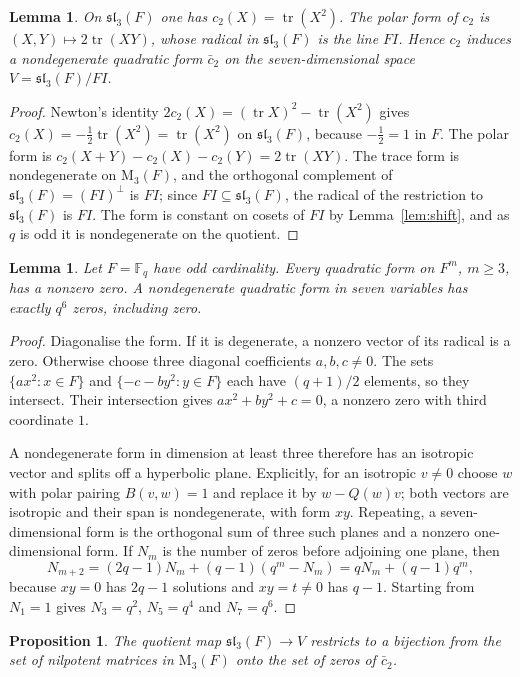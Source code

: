 \documentclass[screen]{aomart}
\newtheorem{proposition}[theorem]{Proposition}
\newtheorem{lemma}[theorem]{Lemma}
\theoremstyle{definition}
\theoremstyle{remark}
\numberwithin{equation}{section}
\newcommand{\F}{\mathbb{F}}
\newcommand{\M}{\mathrm{M}}
\newcommand{\sll}{\mathfrak{sl}}
\newcommand{\tr}{\operatorname{tr}}
\begin{document}
\begin{lemma}\label{lem:quadric}
On $\sll_3(F)$ one has $c_2(X)=\tr(X^2)$. The polar form of $c_2$ is $(X,Y)\mapsto 2\tr(XY)$, whose radical in $\sll_3(F)$ is the line $FI$. Hence $c_2$ induces a nondegenerate quadratic form $\bar c_2$ on the seven-dimensional space $V=\sll_3(F)/FI$.
\end{lemma}

\begin{proof}
Newton's identity $2c_2(X)=(\tr X)^2-\tr(X^2)$ gives $c_2(X)=-\tfrac12\tr(X^2)=\tr(X^2)$ on $\sll_3(F)$, because $-\tfrac12=1$ in $F$. The polar form is $c_2(X+Y)-c_2(X)-c_2(Y)=2\tr(XY)$. The trace form is nondegenerate on $\M_3(F)$, and the orthogonal complement of $\sll_3(F)=(FI)^\perp$ is $FI$; since $FI\subseteq\sll_3(F)$, the radical of the restriction to $\sll_3(F)$ is $FI$. The form is constant on cosets of $FI$ by Lemma~\ref{lem:shift}, and as $q$ is odd it is nondegenerate on the quotient.
\end{proof}

\begin{lemma}\label{lem:finitequadric}
Let $F=\F_q$ have odd cardinality. Every quadratic form on $F^m$, $m\ge3$, has a nonzero zero. A nondegenerate quadratic form in seven variables has exactly $q^6$ zeros, including zero.
\end{lemma}
\begin{proof}
Diagonalise the form. If it is degenerate, a nonzero vector of its radical is a zero. Otherwise choose three diagonal coefficients $a,b,c\ne0$. The sets $\{ax^2:x\in F\}$ and $\{-c-by^2:y\in F\}$ each have $(q+1)/2$ elements, so they intersect. Their intersection gives $ax^2+by^2+c=0$, a nonzero zero with third coordinate $1$.

A nondegenerate form in dimension at least three therefore has an isotropic vector and splits off a hyperbolic plane. Explicitly, for an isotropic $v\ne0$ choose $w$ with polar pairing $B(v,w)=1$ and replace it by $w-Q(w)v$; both vectors are isotropic and their span is nondegenerate, with form $xy$. Repeating, a seven-dimensional form is the orthogonal sum of three such planes and a nonzero one-dimensional form. If $N_m$ is the number of zeros before adjoining one plane, then
\[
 N_{m+2}=(2q-1)N_m+(q-1)(q^m-N_m)
        =qN_m+(q-1)q^m,
\]
because $xy=0$ has $2q-1$ solutions and $xy=t\ne0$ has $q-1$. Starting from $N_1=1$ gives $N_3=q^2$, $N_5=q^4$ and $N_7=q^6$.
\end{proof}

\begin{proposition}\label{prop:cone}
The quotient map $\sll_3(F)\to V$ restricts to a bijection from the set of nilpotent matrices in $\M_3(F)$ onto the set of zeros of $\bar c_2$.
\end{proposition}
\end{document}
